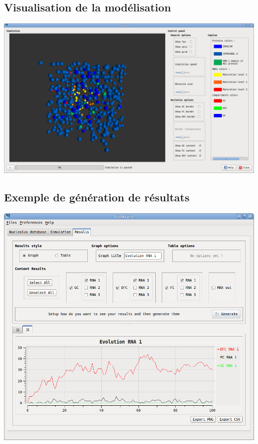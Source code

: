 \documentclass{beamer}
\begin{document}
\subsection{Visualisation de la modélisation}
  
\begin{frame}
    \begin{center}
      \includegraphics[width=1\columnwidth]{img/inter3.png}
  \end{center}
\end{frame}

\subsection{Exemple de génération de résultats}
\begin{frame}
  \begin{center}
      \includegraphics[width=0.7\columnwidth]{img/inter4.png}
    \end{center}
\end{frame}
\end{document}
